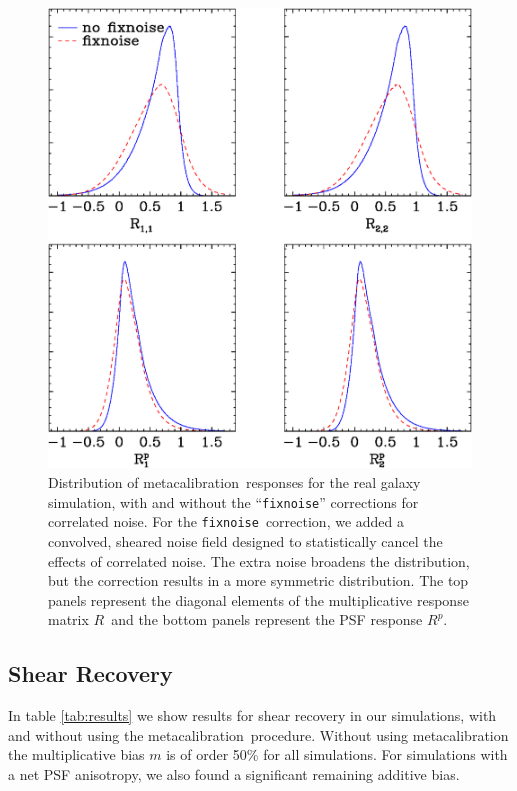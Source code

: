 \documentclass[usegraphicx,usenatbib]{mn2e}
\newcommand{\mcal}{metacalibration}
\newcommand{\mcalR}{$R$}
\newcommand{\mcalRpsf}{$R^{p}$}
\newcommand{\fixnoise}{\texttt{fixnoise}}
\begin{document}
\begin{figure}
    \centering
    \includegraphics[scale=0.45]{mcal-v14s01-v14s02-compare-R.eps}

    \caption{Distribution of \mcal\ responses for the real galaxy
    simulation, with and without the ``\fixnoise'' corrections
    for correlated noise.  For the \fixnoise\ correction, we
    added a convolved, sheared noise field designed to statistically
    cancel the effects of correlated noise.  The extra noise
    broadens the distribution, but the correction results in a more symmetric
    distribution.  The top panels represent the diagonal elements
    of the multiplicative
    response matrix \mcalR\ and the bottom panels represent the PSF response \mcalRpsf.} 

\label{fig:Rdist}
\end{figure}


\subsection{Shear Recovery}


In table \ref{tab:results} we show results for shear recovery in our
simulations, with and without using the \mcal\ procedure.  Without using
\mcal\, the multiplicative bias $m$ is of order 50\% for all simulations.
For simulations with a net PSF anisotropy, we also found a significant
remaining additive bias.
\end{document}
